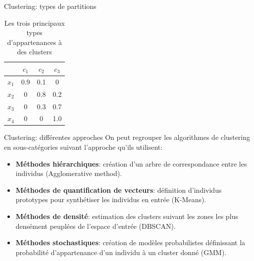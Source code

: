 \documentclass[hyperref={pdfpagelabels=false}]{beamer}
\begin{document}
\begin{frame}{Clustering: types de partitions}
\begin{table}[htbp]
\begin{subtable}{.3\textwidth}
\begin{tabular}{|c|c|c|c|}
                          & $c_1$       & $c_2$ & $c_3$ \\
                    \hline
                    \hline
                    $x_1$   & 0.9    &  0.1       &  0 \\
                    $x_2$   & 0    &  0.8       &  0.2 \\
                    $x_3$   & 0    &  0.3       &  0.7 \\
                    $x_4$   & 0    &  0       &  1.0 \\
                    \hline
                \end{tabular}
                \caption{Clustering flou}
            \end{subtable}
            \caption{Les trois principaux types d'appartenances à des clusters}
        \end{table}
    \end{frame}

    \begin{frame}{Clustering: différentes approches}
        On peut regrouper les algorithmes de clustering en sous-catégories 
        suivant l'approche qu'ils utilisent:
        \begin{itemize}
            \item \textbf{Méthodes hiérarchiques}: création d'un arbre de 
                correspondance entre les individus (Agglomerative method).
            \item \textbf{Méthodes de quantification de vecteurs}: définition 
                d'individus prototypes pour synthétiser les individus en entrée 
                (K-Means).
            \item \textbf{Méthodes de densité}: estimation des clusters suivant 
                les zones les plus densément peuplées de l'espace d'entrée 
                (DBSCAN).
            \item \textbf{Méthodes stochastiques}: création de modèles 
                probabilistes définissant la probabilité d'appartenance d'un 
                individu à un cluster donné (GMM).
        \end{itemize}
    \end{frame}
\end{document}
